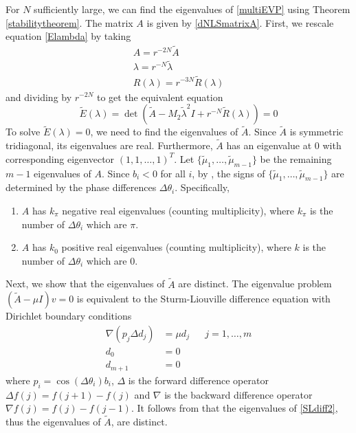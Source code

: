 \documentclass[12pt]{article}
\begin{document}
For $N$ sufficiently large, we can find the eigenvalues of \eqref{multiEVP} using Theorem \ref{stabilitytheorem}. The matrix $A$ is given by \eqref{dNLSmatrixA}. First, we rescale equation \eqref{Elambda} by taking
\begin{align*}
A = r^{-2N} \tilde{A} \\
\lambda = r^{-N} \tilde{\lambda} \\
R(\lambda) = r^{-3N} \tilde{R}(\lambda)
\end{align*}
and dividing by $r^{-2N}$ to get the equivalent equation
\begin{equation}\label{dNLStildeE}
\tilde{E}(\lambda) = 
\det(\tilde{A} - M_2 \tilde{\lambda}^2 I + r^{-N} \tilde{R}(\lambda)) = 0
\end{equation}
To solve $\tilde{E}(\lambda) = 0$, we need to find the eigenvalues of $\tilde{A}$. Since $\tilde{A}$ is symmetric tridiagonal, its eigenvalues are real. Furthermore, $\tilde{A}$ has an eigenvalue at 0 with corresponding eigenvector $(1, 1, \dots, 1)^T$. Let $\{ \tilde{\mu}_1, \dots, \tilde{\mu}_{m-1}\}$ be the remaining $m-1$ eigenvalues of $A$. Since $b_i < 0$ for all $i$, by \cite[Lemma 5.4]{Sandstede1998}, the signs of $\{ \tilde{\mu}_1, \dots, \tilde{\mu}_{m-1}\}$ are determined by the phase differences $\Delta\theta_i$. Specifically,
\begin{enumerate}
	\item $A$ has $k_\pi$ negative real eigenvalues (counting multiplicity), where $k_\pi$ is the number of $\Delta\theta_i$ which are $\pi$. 
	\item $A$ has $k_0$ positive real eigenvalues (counting multiplicity), where $k$ is the number of $\Delta\theta_i$ which are $0$. 
\end{enumerate}

Next, we show that the eigenvalues of $\tilde{A}$ are distinct. The eigenvalue problem $(\tilde{A} - \mu I)v = 0$ is equivalent to the Sturm-Liouville difference equation with Dirichlet boundary conditions
\begin{equation}\label{SLdiff2}
\begin{aligned}
\nabla( p_j \Delta d_j ) &= \mu d_j && j = 1, \dots, m \\
d_0 &= 0 \\
d_{m+1} &= 0
\end{aligned}
\end{equation}
where $p_i = \cos(\Delta\theta_i) b_i$, $\Delta$ is the forward difference operator $\Delta f(j) = f(j+1) - f(j)$ and $\nabla$ is the backward difference operator $\nabla f(j) = f(j) - f(j-1)$. It follows from \cite[Corollary 2.2.7]{Jirari1995} that the eigenvalues of \eqref{SLdiff2}, thus the eigenvalues of $\tilde{A}$, are distinct.
\end{document}
